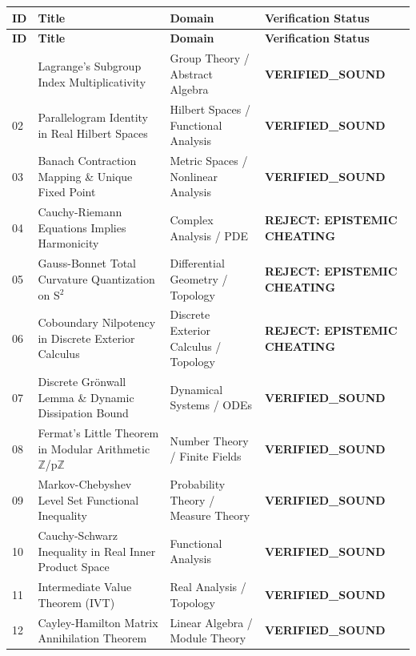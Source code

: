 \documentclass[10pt,a4paper]{article}
\begin{document}
\begin{longtable}{p{0.6cm} p{6.8cm} p{4.0cm} p{3.2cm}}
\toprule
\textbf{ID} & \textbf{Title} & \textbf{Domain} & \textbf{Verification Status} \\
\midrule
\endfirsthead
\toprule
\textbf{ID} & \textbf{Title} & \textbf{Domain} & \textbf{Verification Status} \\
\midrule
\endhead
\bottomrule
\endfoot
\bottomrule
\endlastfoot
01 & Lagrange's Subgroup Index Multiplicativity & Group Theory / Abstract Algebra & \textcolor{green!70!black}{\textbf{VERIFIED\_SOUND}} \\
02 & Parallelogram Identity in Real Hilbert Spaces & Hilbert Spaces / Functional Analysis & \textcolor{green!70!black}{\textbf{VERIFIED\_SOUND}} \\
03 & Banach Contraction Mapping \& Unique Fixed Point & Metric Spaces / Nonlinear Analysis & \textcolor{green!70!black}{\textbf{VERIFIED\_SOUND}} \\
04 & Cauchy-Riemann Equations Implies Harmonicity & Complex Analysis / PDE & \textcolor{red!80!black}{\textbf{REJECT: EPISTEMIC CHEATING}} \\
05 & Gauss-Bonnet Total Curvature Quantization on S$^2$ & Differential Geometry / Topology & \textcolor{red!80!black}{\textbf{REJECT: EPISTEMIC CHEATING}} \\
06 & Coboundary Nilpotency in Discrete Exterior Calculus & Discrete Exterior Calculus / Topology & \textcolor{red!80!black}{\textbf{REJECT: EPISTEMIC CHEATING}} \\
07 & Discrete Grönwall Lemma \& Dynamic Dissipation Bound & Dynamical Systems / ODEs & \textcolor{green!70!black}{\textbf{VERIFIED\_SOUND}} \\
08 & Fermat's Little Theorem in Modular Arithmetic $\mathbb{Z}$/p$\mathbb{Z}$ & Number Theory / Finite Fields & \textcolor{green!70!black}{\textbf{VERIFIED\_SOUND}} \\
09 & Markov-Chebyshev Level Set Functional Inequality & Probability Theory / Measure Theory & \textcolor{green!70!black}{\textbf{VERIFIED\_SOUND}} \\
10 & Cauchy-Schwarz Inequality in Real Inner Product Space & Functional Analysis & \textcolor{green!70!black}{\textbf{VERIFIED\_SOUND}} \\
11 & Intermediate Value Theorem (IVT) & Real Analysis / Topology & \textcolor{green!70!black}{\textbf{VERIFIED\_SOUND}} \\
12 & Cayley-Hamilton Matrix Annihilation Theorem & Linear Algebra / Module Theory & \textcolor{green!70!black}{\textbf{VERIFIED\_SOUND}} \\

\end{longtable}
\end{document}
